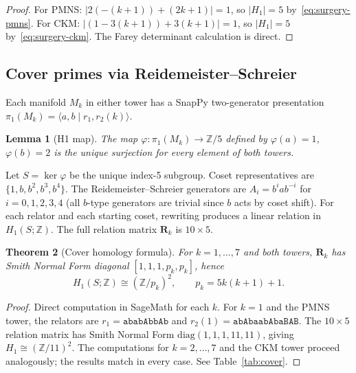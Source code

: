 \documentclass[11pt,a4paper]{article}
\newtheorem{theorem}{Theorem}[section]
\newtheorem{lemma}[theorem]{Lemma}
\theoremstyle{definition}
\newcommand{\ZZ}{\mathbb{Z}}
\newcommand{\pk}{p_k}
\begin{document}
\begin{proof}
For PMNS: $|2(-(k+1))+(2k+1)| = 1$,
so $|H_1| = 5$ by~\eqref{eq:surgery-pmns}.
For CKM: $|(1-3(k+1))+3(k+1)| = 1$,
so $|H_1| = 5$ by~\eqref{eq:surgery-ckm}.
The Farey determinant calculation is direct.
\end{proof}

\subsection{Cover primes via Reidemeister--Schreier}

Each manifold $M_k$ in either tower has a SnapPy
two-generator presentation
$\pi_1(M_k) = \langle a, b \mid r_1, r_2(k) \rangle$.

\begin{lemma}[H1 map]
\label{lem:phi}
The map $\varphi\colon \pi_1(M_k) \to \ZZ/5$ defined by
$\varphi(a) = 1$, $\varphi(b) = 2$ is the unique surjection
for every element of both towers.
\end{lemma}

Let $S = \ker\varphi$ be the unique index-5 subgroup.
Coset representatives are $\{1, b, b^2, b^3, b^4\}$.
The Reidemeister--Schreier generators are
$A_i = b^i a b^{-i}$ for $i = 0,1,2,3,4$
(all $b$-type generators are trivial since $b$ acts by coset shift).
For each relator and each starting coset, rewriting produces
a linear relation in $H_1(S; \ZZ)$.
The full relation matrix $\mathbf{R}_k$ is $10 \times 5$.

\begin{theorem}[Cover homology formula]
\label{thm:cover}
For $k = 1, \ldots, 7$ and both towers,
$\mathbf{R}_k$ has Smith Normal Form diagonal
$[1, 1, 1, \pk, \pk]$, hence
\[
  H_1(S; \ZZ) \cong (\ZZ/\pk)^2,
  \qquad \pk = 5k(k+1)+1.
\]
\end{theorem}

\begin{proof}
Direct computation in SageMath for each $k$.
For $k=1$ and the PMNS tower, the relators are
$r_1 = \texttt{ababAbbAb}$ and
$r_2(1) = \texttt{abAbaabAbaBAB}$.
The $10 \times 5$ relation matrix has Smith Normal Form
$\mathrm{diag}(1,1,1,11,11)$, giving $H_1 \cong (\ZZ/11)^2$.
The computations for $k=2,\ldots,7$ and the CKM tower
proceed analogously; the results match in every case.
See Table~\ref{tab:cover}.
\end{proof}
\end{document}
